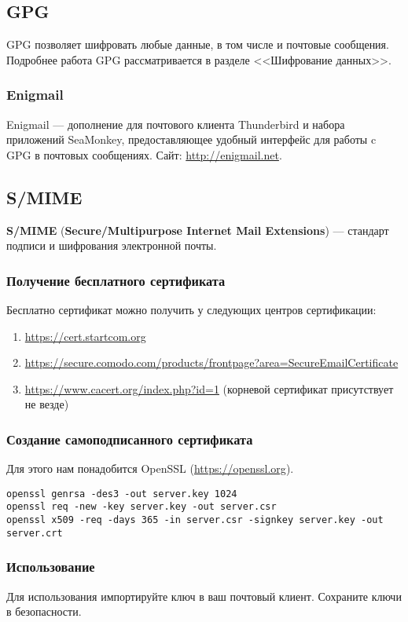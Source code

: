\subsection{GPG}
GPG позволяет шифровать любые данные, в том числе и почтовые сообщения. Подробнее работа GPG рассматривается в разделе <<Шифрование данных>>.
\subsubsection{Enigmail}
Enigmail --- дополнение для почтового клиента Thunderbird и набора приложений SeaMonkey, предоставляющее удобный интерфейс для работы c GPG в почтовых сообщениях. Сайт: \url{http://enigmail.net}.
\subsection{S/MIME}
\textbf{S/MIME} (\textbf{Secure/Multipurpose Internet Mail Extensions}) --- стандарт подписи и шифрования электронной почты.
\subsubsection{Получение бесплатного сертификата}
Бесплатно сертификат можно получить у следующих центров сертификации:
\begin{enumerate}
\item \url{https://cert.startcom.org}
\item \url{https://secure.comodo.com/products/frontpage?area=SecureEmailCertificate}
\item \url{https://www.cacert.org/index.php?id=1} (корневой сертификат присутствует не везде)
\end{enumerate}
\subsubsection{Создание самоподписанного сертификата}
Для этого нам понадобится OpenSSL (\url{https://openssl.org}).
\begin{lstlisting}
openssl genrsa -des3 -out server.key 1024
openssl req -new -key server.key -out server.csr
openssl x509 -req -days 365 -in server.csr -signkey server.key -out server.crt
\end{lstlisting}
\subsubsection{Использование}
Для использования импортируйте ключ в ваш почтовый клиент. Сохраните ключи в безопасности.

